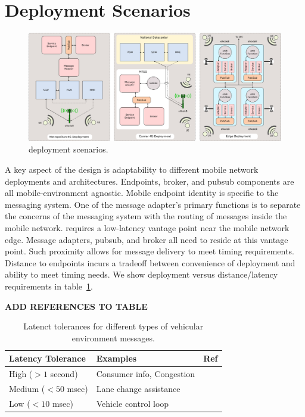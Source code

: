 \section{Deployment Scenarios}
\label{sec:deployments}

\begin{figure}[ht]
  \centering
  \includegraphics[width=\textwidth]{figs/deploy.png}
  \caption{\name{} deployment scenarios.}
  \label{fig:deployments}
\end{figure}

A key aspect of the \name{} design is adaptability to different mobile
network deployments and architectures. Endpoints, broker, and pubsub
components are all mobile-environment agnostic. Mobile endpoint
identity is specific to the \name{} messaging system. One of the message
adapter's primary functions is to separate the concerns of the
messaging system with the routing of messages inside the mobile
network.  \name{} requires a low-latency vantage point near the mobile
network edge. Message adapters, pubsub, and broker all need to reside
at this vantage point.  Such proximity allows for message delivery to
meet timing requirements.  Distance to endpoints incurs a tradeoff between
convenience of deployment and ability to meet timing needs. We show
deployment versus distance/latency requirements in
table~\ref{tab:lat-req}.

{\bf ADD REFERENCES TO TABLE}

\begin{table}[h]
  \centering
  \begin{tabular}{| l | l | l |}
    \hline
    \textbf{Latency Tolerance} & \textbf{Examples} & \textbf{Ref} \\ \hline \hline
    High ($> 1$ second) & Consumer info, Congestion & \cite{camp2005vehicle,papadimitratos2009vehicular} \\ \hline
    Medium ($< 50$ msec) & Lane change assistance & \cite{FIXME} \\ \hline
    Low ($< 10$ msec) & Vehicle control loop & \cite{hansson2002integrating} \\ \hline
    \hline
  \end{tabular}
  \label{tab:lat-req}
  \caption{Latenct tolerances for different types of vehicular environment messages.}
\end{table}

